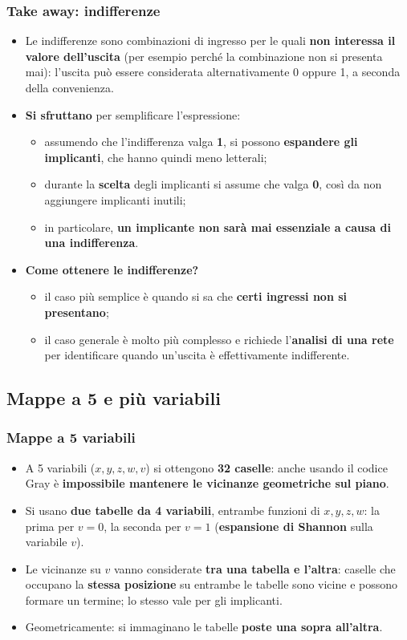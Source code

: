 \documentclass[12pt, a4paper]{article}
\begin{document}
\subsubsection{Take away: indifferenze}
\begin{itemize}
    \item Le indifferenze sono combinazioni di ingresso per le quali \textbf{non interessa il valore dell'uscita} (per esempio perché la combinazione non si presenta mai): l'uscita può essere considerata alternativamente 0 oppure 1, a seconda della convenienza.
    \item \textbf{Si sfruttano} per semplificare l'espressione:
    \begin{itemize}
        \item assumendo che l'indifferenza valga \textbf{1}, si possono \textbf{espandere gli implicanti}, che hanno quindi meno letterali;
        \item durante la \textbf{scelta} degli implicanti si assume che valga \textbf{0}, così da non aggiungere implicanti inutili;
        \item in particolare, \textbf{un implicante non sarà mai essenziale a causa di una indifferenza}.
    \end{itemize}
    \item \textbf{Come ottenere le indifferenze?}
    \begin{itemize}
        \item il caso più semplice è quando si sa che \textbf{certi ingressi non si presentano};
        \item il caso generale è molto più complesso e richiede l'\textbf{analisi di una rete} per identificare quando un'uscita è effettivamente indifferente.
    \end{itemize}
\end{itemize}

\subsection{Mappe a 5 e più variabili}

\subsubsection{Mappe a 5 variabili}
\begin{itemize}
    \item A 5 variabili ($x, y, z, w, v$) si ottengono \textbf{32 caselle}: anche usando il codice Gray è \textbf{impossibile mantenere le vicinanze geometriche sul piano}.
    \item Si usano \textbf{due tabelle da 4 variabili}, entrambe funzioni di $x, y, z, w$: la prima per $v = 0$, la seconda per $v = 1$ (\textbf{espansione di Shannon} sulla variabile $v$).
    \item Le vicinanze su $v$ vanno considerate \textbf{tra una tabella e l'altra}: caselle che occupano la \textbf{stessa posizione} su entrambe le tabelle sono vicine e possono formare un termine; lo stesso vale per gli implicanti.
    \item Geometricamente: si immaginano le tabelle \textbf{poste una sopra all'altra}.
\end{itemize}
\end{document}
